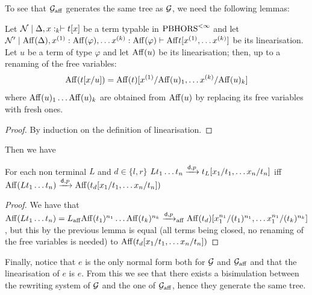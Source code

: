 To see that $\mathcal{G}_{\mathrm{aff}}$ generates the same tree as $\mathcal{G}$, we need the following lemmas:
\begin{lemma}
	Let $\mathcal{N} \mid \Delta, x:_k  \vdash  t[x]$ be a term typable in $\text{PBHORS}^{<\infty}$ and let $\mathcal{N}' \mid {\mathrm{Aff}}(\Delta), x^{(1)}: {\mathrm{Aff}}(\varphi), \dots x^{(k)}: {\mathrm{Aff}}(\varphi) \vdash  {\mathrm{Aff}} t[x^{(1)}, \dots x^{(k)}]$ be its linearisation. Let $u$ be a term of type $\varphi$ and let ${\mathrm{Aff}}(u)$ be its linearisation; then, up to a renaming of the free variables:
	$${\mathrm{Aff}}(t[x/u]) = {\mathrm{Aff}}(t)[x^{(1)}/{\mathrm{Aff}}(u)_1, \dots x^{(k)}/{\mathrm{Aff}}(u)_k] $$ 
	where ${\mathrm{Aff}}(u)_1 \dots {\mathrm{Aff}}(u)_k$ are obtained from ${\mathrm{Aff}}(u)$ by replacing its free variables with fresh ones.
\end{lemma}
\begin{proof}
	By induction on the definition of linearisation.
\end{proof}
Then we have
\begin{lemma} For each non terminal $L$ and $d \in \{l,r\}$
	$L t_1 \dots t_n  \xrightarrow{\mathsf d,p} t_L[x_1/t_1, \dots x_n/t_n]$ iff ${\mathrm{Aff}}(L t_1 \dots t_n)  \xrightarrow{\mathsf d,p} {\mathrm{Aff}}(t_d[x_1/t_1, \dots x_n/t_n])$
\end{lemma}
\begin{proof}
	We have that ${\mathrm{Aff}}(Lt_1 \dots t_n)= L_{\mathrm{aff}} {\mathrm{Aff}}(t_1)^{n_1} \dots {\mathrm{Aff}}(t_k)^{n_k} \xrightarrow{\mathsf d,p}_{\mathrm{aff}} {\mathrm{Aff}}(t_d)[x_1^{n_1}/(t_1)^{n_1}, \dots x_1^{n_1}/(t_k)^{n_k}]$, but this by the previous lemma is equal (all terms being closed, no renaming of the free variables is needed) to ${\mathrm{Aff}}(t_d[x_1/t_1, \dots x_n/t_n])$
\end{proof}  
Finally, notice that $e$ is the only normal form both for $\mathcal{G}$ and $\mathcal{G}_{\mathrm{aff}}$ and that the linearisation of $e$ is $e$. From this we see that there exists a bisimulation between the rewriting system of $\mathcal{G}$ and the one of $\mathcal{G}_{\mathrm{aff}}$, hence they generate the same tree.
